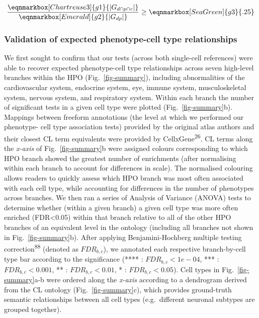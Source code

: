 \documentclass[
]{article}
\begin{document}
\hfill\break

\begin{equation*}
  \frac{
     \eqnmarkbox[Chartreuse3]{g1}{|G_{d \cap p \cap c} |}
    }{
       \eqnmarkbox[Emerald]{g2}{|G_{dp}|}} 
  \geq \eqnmarkbox[SeaGreen]{g3}{.25} 
\end{equation*}

\hfill\break
\hfill\break

\subsubsection{Validation of expected phenotype-cell type
relationships}\label{validation-of-expected-phenotype-cell-type-relationships-1}

We first sought to confirm that our tests (across both single-cell
references) were able to recover expected phenotype-cell type
relationships across seven high-level branches within the HPO
(Fig.~\ref{fig-summary}), including abnormalities of the cardiovascular
system, endocrine system, eye, immune system, musculoskeletal system,
nervous system, and respiratory system. Within each branch the number of
significant tests in a given cell type were plotted
(Fig.~\ref{fig-summary}b). Mappings between freeform annotations (the
level at which we performed our phenotype- cell type association tests)
provided by the original atlas authors and their closest CL term
equivalents were provided by CellxGene\textsuperscript{26}. CL terms
along the \emph{x-axis} of Fig.~\ref{fig-summary}b were assigned colours
corresponding to which HPO branch showed the greatest number of
enrichments (after normalising within each branch to account for
differences in scale). The normalised colouring allows readers to
quickly assess which HPO branch was most often associated with each cell
type, while accounting for differences in the number of phenotypes
across branches. We then ran a series of Analysis of Variance (ANOVA)
tests to determine whether (within a given branch) a given cell type was
more often enriched (FDR\textless0.05) within that branch relative to
all of the other HPO branches of an equivalent level in the ontology
(including all branches not shown in Fig.~\ref{fig-summary}b). After
applying Benjamini-Hochberg multiple testing
correction\textsuperscript{88} (denoted as \(FDR _{b,c}\)), we annotated
each respective branch-by-cell type bar according to the significance
(**** : \(FDR _{b,c}<1e-04\), *** : \(FDR _{b,c}<0.001\), ** :
\(FDR _{b,c}<0.01\), * : \(FDR _{b,c}<0.05\)). Cell types in
Fig.~\ref{fig-summary}a-b were ordered along the \emph{x-axis} according
to a dendrogram derived from the CL ontology (Fig.~\ref{fig-summary}c),
which provides ground-truth semantic relationships between all cell
types (e.g.~different neuronal subtypes are grouped together).
\end{document}

